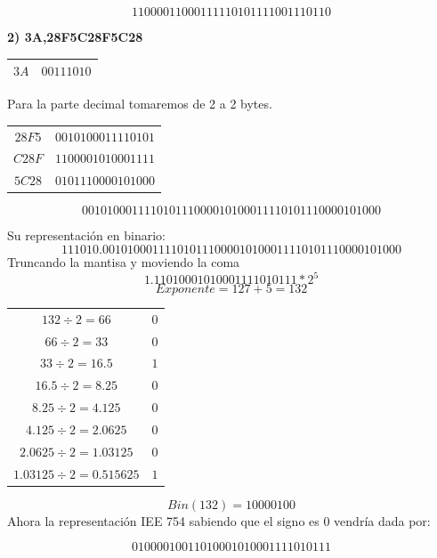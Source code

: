 \documentclass[12pt]{article}
\begin{document}
$$11000011000111110101111001110110$$

\large{\textbf{2) 3A,28F5C28F5C28}}
\normalsize
\begin{center}
    \begin{tabular}{|c|c|}
        \hline
        $3A$ & $0011 1010$\\
        \hline
      \end{tabular} 
\end{center}
Para la parte decimal tomaremos de 2 a 2 bytes. 
\begin{center}
    \begin{tabular}{|c|c|}
        \hline
        $28F5$ & $0010 1000 1111 0101$\\
        $C28F$ & $1100 0010 1000 1111$\\
        $5C28$ & $0101 1100 0010 1000$\\
        \hline
      \end{tabular} 
\end{center}
$$0010 1000 1111 0101 1100 0010 1000 1111 0101 1100 0010 1000$$

Su representación en binario: 
$$11 1010.0010 1000 1111 0101 1100 0010 1000 1111 0101 1100 0010 1000$$
Truncando la mantisa y moviendo la coma 
$$1.1 1010 0010 1000 1111 0101 11 * 2^5$$
$$Exponente= 127+5=132$$
\begin{center}
    \begin{tabular}{|c|c|}
        \hline
        $132 \div 2 = 66$ & $0$\\
        $66 \div 2 = 33$ & $0$\\
        $33 \div 2 = 16.5$ & $1$\\
        $16.5 \div 2 = 8.25$ & $0$\\
        $8.25 \div 2 = 4.125$ & $0$\\
        $4.125 \div 2 = 2.0625$ & $0$\\
        $2.0625 \div 2 = 1.03125$ & $0$\\
        $1.03125 \div 2 = 0.515625$ & $1$\\
        \hline
      \end{tabular} 
\end{center}
$$Bin(132) = 10000100$$
Ahora la representación IEE 754 sabiendo que el signo es 0 vendría dada por:

$$01000010011010001010001111010111$$
\end{document}
